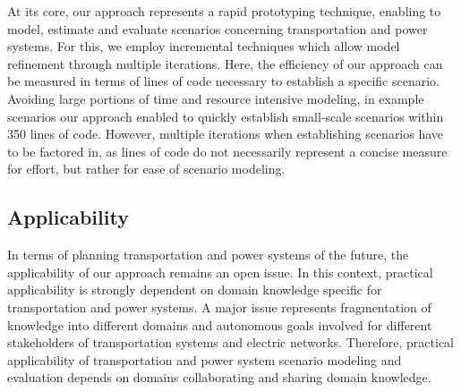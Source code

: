 At its core, our approach represents a rapid prototyping technique, enabling to model, estimate and evaluate scenarios concerning transportation and power systems. For this, we employ incremental techniques which allow model refinement through multiple iterations. Here, the efficiency of our approach can be measured in terms of lines of code necessary to establish a specific scenario. Avoiding large portions of time and resource intensive modeling, in example scenarios our approach enabled to quickly establish small-scale scenarios within 350 lines of code. However, multiple iterations when establishing scenarios have to be factored in, as lines of code do not necessarily represent a concise measure for effort, but rather for ease of scenario modeling.

\subsection{Applicability}

In terms of planning transportation and power systems of the future, the applicability of our approach remains an open issue. In this context, practical applicability is strongly dependent on domain knowledge specific for transportation and power systems. A major issue represents fragmentation of knowledge into different domains and autonomous goals involved for different stakeholders of transportation systems and electric networks. Therefore, practical applicability of transportation and power system scenario modeling and evaluation depends on domains collaborating and sharing domain knowledge.